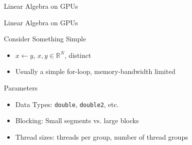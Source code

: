\begin{frame}{Linear Algebra on GPUs}
\begin{center}
 \end{center}

\end{frame}



\begin{frame}{Linear Algebra on GPUs}

 \begin{block}{Consider Something Simple}
  \begin{itemize}
   \item $x \leftarrow y$, $x,y \in \mathbb{R}^N$, distinct
   \item Usually a simple for-loop, memory-bandwidth limited
  \end{itemize}
 \end{block}

 \begin{block}{Parameters}
  \begin{itemize}
   \item Data Types: \lstinline|double|, \lstinline|double2|, etc.
   \item Blocking: Small segments vs. large blocks
   \item Thread sizes: threads per group, number of thread groups
  \end{itemize}
  \vspace*{-0.3cm}
 \end{block}

\end{frame}


